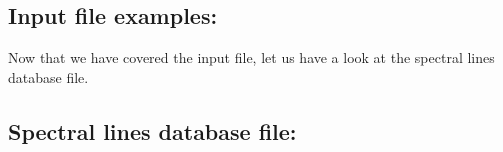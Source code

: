 \subsection{Input file examples:}

%
Now that we have covered the input file, let us have a look at the spectral lines database file.\\
\subsection{Spectral lines database file:}

%

